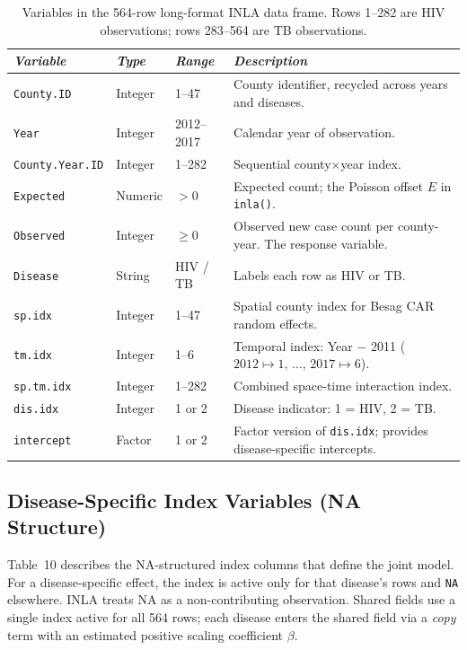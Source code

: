 \documentclass[11pt,a4paper]{article}
\newcommand{\code}[1]{\texttt{\small #1}}
\begin{document}
\begin{table}[H]
\caption{Variables in the 564-row long-format INLA data frame. Rows 1--282 are HIV observations; rows 283--564 are TB observations.}
\renewcommand{\arraystretch}{1.10}
\scriptsize\begin{tabularx}{\textwidth}{@{}L{3.0cm}L{1.6cm}L{2.0cm}X@{}}
\toprule
\textit{Variable} & \textit{Type} & \textit{Range} & \textit{Description}\\
\midrule
\code{County.ID}      & Integer & 1--47      & County identifier, recycled across years and diseases.\\
\code{Year}           & Integer & 2012--2017 & Calendar year of observation.\\
\code{County.Year.ID} & Integer & 1--282     & Sequential county$\times$year index.\\
\code{Expected}       & Numeric & $>0$       & Expected count; the Poisson offset $E$ in \code{inla()}.\\
\code{Observed}       & Integer & $\geq 0$   & Observed new case count per county-year. The response variable.\\
\code{Disease}        & String  & HIV / TB   & Labels each row as HIV or TB.\\
\code{sp.idx}         & Integer & 1--47      & Spatial county index for Besag CAR random effects.\\
\code{tm.idx}         & Integer & 1--6       & Temporal index: Year $-$ 2011 ($2012\mapsto1,\,\ldots,\,2017\mapsto6$).\\
\code{sp.tm.idx}      & Integer & 1--282     & Combined space-time interaction index.\\
\code{dis.idx}        & Integer & 1 or 2     & Disease indicator: 1 = HIV, 2 = TB.\\
\code{intercept}      & Factor  & 1 or 2     & Factor version of \code{dis.idx}; provides disease-specific intercepts.\\
\bottomrule
\end{tabularx}
\renewcommand{\arraystretch}{1.10}
\end{table}

\subsection{Disease-Specific Index Variables (NA Structure)}

Table~10 describes the NA-structured index columns that define the joint model.
For a disease-specific effect, the index is active only for that disease's rows
and \texttt{NA} elsewhere. INLA treats NA as a non-contributing observation.
Shared fields use a single index active for all 564 rows; each disease enters
the shared field via a \textit{copy} term with an estimated positive scaling
coefficient $\beta$.
\end{document}
